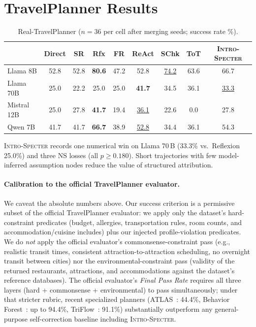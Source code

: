 \documentclass{article}
\newcommand{\method}{\textsc{Intro-Specter}\xspace}
\begin{document}
\section{TravelPlanner Results}\label{app:travel}
\begin{table}[h]\centering\small
\caption{Real-TravelPlanner ($n{=}36$ per cell after merging seeds; success rate \%).}
\begin{tabular}{lcccccccc}\toprule
& Direct & SR & Rfx & FR & ReAct & SChk & ToT & \method \\\midrule
Llama 8B    & 52.8 & 52.8 & \textbf{80.6} & 47.2 & 52.8 & \underline{74.2} & 63.6 & 66.7 \\
Llama 70B   & 25.0 & 22.2 & 25.0 & 25.0 & \textbf{41.7} & 34.5 & 36.1 & \underline{33.3} \\
Mistral 12B & 25.0 & 27.8 & \textbf{41.7} & 19.4 & \underline{36.1} & 22.6 & 0.0 & 27.8 \\
Qwen 7B     & 41.7 & 41.7 & \textbf{66.7} & 38.9 & \underline{52.8} & 34.4 & 36.1 & 54.3 \\
\bottomrule\end{tabular}\end{table}

\method records one numerical win on Llama 70\,B (33.3\% vs.\ Reflexion 25.0\%) and three NS losses (all $p \geq 0.180$). Short trajectories with few model-inferred assumption nodes reduce the value of structured attribution.

\paragraph{Calibration to the official TravelPlanner evaluator.} We caveat the absolute numbers above. Our success criterion is a permissive subset of the official TravelPlanner evaluator: we apply only the dataset's hard-constraint predicates (budget, allergies, transportation rules, room counts, and accommodation/cuisine includes) plus our injected profile-violation predicates. We do \emph{not} apply the official evaluator's commonsense-constraint pass (e.g., realistic transit times, consistent attraction-to-attraction scheduling, no overnight transit between cities) nor the environmental-constraint pass (validity of the returned restaurants, attractions, and accommodations against the dataset's reference databases). The official evaluator's \emph{Final Pass Rate} requires all three layers (hard + commonsense + environmental) to pass simultaneously; under that stricter rubric, recent specialized planners (ATLAS~\citep{choi2025atlas}: 44.4\%, Behavior Forest~\citep{yuan2026behaviorforest}: up to 94.4\%, TriFlow~\citep{chen2026triflow}: 91.1\%) substantially outperform any general-purpose self-correction baseline including \method.
\end{document}
